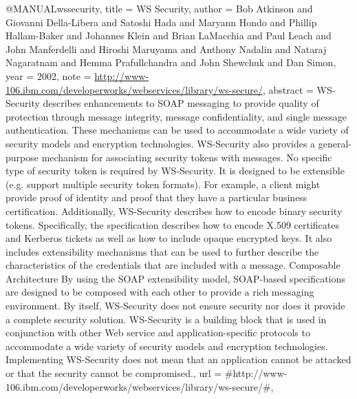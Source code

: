 @MANUAL{wssecurity,
  title = {{WS Security}},
  author = {Bob Atkinson and Giovanni Della-Libera and Satoshi Hada and Maryann
	Hondo and Phillip Hallam-Baker and Johannes Klein and Brian LaMacchia
	and Paul Leach and John Manferdelli and Hiroshi Maruyama and Anthony
	Nadalin and Nataraj Nagaratnam and Hemma Prafullchandra and John
	Shewchuk and Dan Simon},
  year = {2002},
  note = {\url{http://www-106.ibm.com/developerworks/webservices/library/ws-secure/}},
  abstract = {WS-Security describes enhancements to SOAP messaging to
provide quality
	of protection through message integrity, message
confidentiality,
	and single message authentication. These mechanisms
can be used to
	accommodate a wide variety of security models and
encryption technologies.
	WS-Security also provides a general-purpose
mechanism for associating
	security tokens with messages. No specific
type of security token
	is required by WS-Security. It is designed to
be extensible (e.g.
	support multiple security token formats). For
example, a client might
	provide proof of identity and proof that they
have a particular business
	certification. Additionally, WS-Security
describes how to encode
	binary security tokens. Specifically, the
specification describes
	how to encode X.509 certificates and Kerberos tickets
as well as
	how to include opaque encrypted keys. It also includes
extensibility
	mechanisms that can be used to further describe the
characteristics
	of the credentials that are included with a message.
Composable Architecture
	By using the SOAP extensibility model, SOAP-based
specifications
	are designed to be composed with each other to provide a rich
messaging
	environment. By itself, WS-Security does not ensure security
nor
	does it provide a complete security solution. WS-Security is a
building
	block that is used in conjunction with other Web service and
application-specific
	protocols to accommodate a wide variety of security models and
encryption
	technologies. Implementing WS-Security does not mean that an
application
	cannot be attacked or that the security cannot be compromised.},
  url = {#http://www-106.ibm.com/developerworks/webservices/library/ws-secure/#},
}

